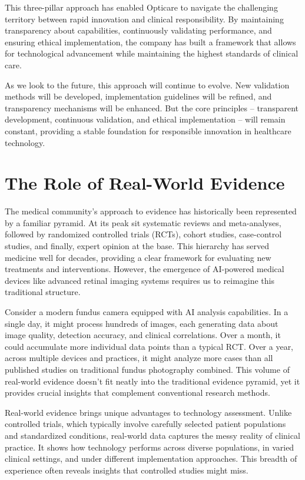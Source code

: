 \documentclass[
  Letterpaper,
]{scrbook}
\begin{document}
This three-pillar approach has enabled Opticare to navigate the
challenging territory between rapid innovation and clinical
responsibility. By maintaining transparency about capabilities,
continuously validating performance, and ensuring ethical
implementation, the company has built a framework that allows for
technological advancement while maintaining the highest standards of
clinical care.

As we look to the future, this approach will continue to evolve. New
validation methods will be developed, implementation guidelines will be
refined, and transparency mechanisms will be enhanced. But the core
principles -- transparent development, continuous validation, and
ethical implementation -- will remain constant, providing a stable
foundation for responsible innovation in healthcare technology.

\section{The Role of Real-World
Evidence}\label{the-role-of-real-world-evidence}

The medical community's approach to evidence has historically been
represented by a familiar pyramid. At its peak sit systematic reviews
and meta-analyses, followed by randomized controlled trials (RCTs),
cohort studies, case-control studies, and finally, expert opinion at the
base. This hierarchy has served medicine well for decades, providing a
clear framework for evaluating new treatments and interventions.
However, the emergence of AI-powered medical devices like advanced
retinal imaging systems requires us to reimagine this traditional
structure.

Consider a modern fundus camera equipped with AI analysis capabilities.
In a single day, it might process hundreds of images, each generating
data about image quality, detection accuracy, and clinical correlations.
Over a month, it could accumulate more individual data points than a
typical RCT. Over a year, across multiple devices and practices, it
might analyze more cases than all published studies on traditional
fundus photography combined. This volume of real-world evidence doesn't
fit neatly into the traditional evidence pyramid, yet it provides
crucial insights that complement conventional research methods.

Real-world evidence brings unique advantages to technology assessment.
Unlike controlled trials, which typically involve carefully selected
patient populations and standardized conditions, real-world data
captures the messy reality of clinical practice. It shows how technology
performs across diverse populations, in varied clinical settings, and
under different implementation approaches. This breadth of experience
often reveals insights that controlled studies might miss.
\end{document}
